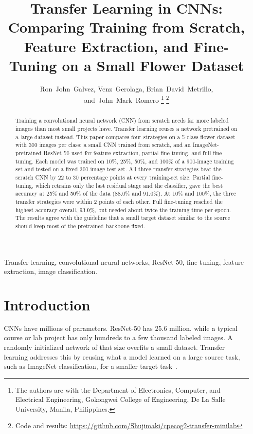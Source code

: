 \documentclass[journal]{IEEEtran}
\begin{document}
\title{Transfer Learning in CNNs: Comparing Training from Scratch, Feature Extraction, and Fine-Tuning on a Small Flower Dataset}

\author{Ron~John~Galvez,
        Venz~Gerolaga,
        Brian~David~Metrillo,
        and~John~Mark~Romero
\thanks{The authors are with the Department of Electronics, Computer, and Electrical Engineering, Gokongwei College of Engineering, De La Salle University, Manila, Philippines.}
\thanks{Code and results: \url{https://github.com/Shujimaki/cpecog2-transfer-minilab}}}


\maketitle

\begin{abstract}
Training a convolutional neural network (CNN) from scratch needs far more labeled images than most small projects have. Transfer learning reuses a network pretrained on a large dataset instead. This paper compares four strategies on a 5-class flower dataset with 300 images per class: a small CNN trained from scratch, and an ImageNet-pretrained ResNet-50 used for feature extraction, partial fine-tuning, and full fine-tuning. Each model was trained on 10\%, 25\%, 50\%, and 100\% of a 900-image training set and tested on a fixed 300-image test set. All three transfer strategies beat the scratch CNN by 22 to 30 percentage points at every training-set size. Partial fine-tuning, which retrains only the last residual stage and the classifier, gave the best accuracy at 25\% and 50\% of the data (88.0\% and 91.0\%). At 10\% and 100\%, the three transfer strategies were within 2 points of each other. Full fine-tuning reached the highest accuracy overall, 93.0\%, but needed about twice the training time per epoch. The results agree with the guideline that a small target dataset similar to the source should keep most of the pretrained backbone fixed.
\end{abstract}

\begin{IEEEkeywords}
Transfer learning, convolutional neural networks, ResNet-50, fine-tuning, feature extraction, image classification.
\end{IEEEkeywords}

\section{Introduction}
 CNNs have millions of parameters. ResNet-50 has 25.6 million, while a typical course or lab project has only hundreds to a few thousand labeled images. A randomly initialized network of that size overfits a small dataset. Transfer learning addresses this by reusing what a model learned on a large source task, such as ImageNet classification, for a smaller target task~\cite{pan2010survey}.
\end{document}
